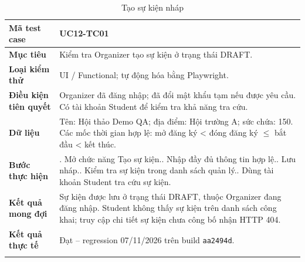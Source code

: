 \begin{table}[H]
\centering
\begingroup\small
\renewcommand{\arraystretch}{1.18}
\caption{Tạo sự kiện nháp}\label{tab:i1-detail-3}
\begin{tabularx}{\linewidth}{@{}p{.23\linewidth}>{\raggedright\arraybackslash}X@{}}
\toprule
\textbf{Mã test case} & \textbf{UC12-TC01} \\\midrule
\textbf{Mục tiêu} & Kiểm tra Organizer tạo sự kiện ở trạng thái DRAFT. \\ \addlinespace[3pt]
\textbf{Loại kiểm thử} & UI / Functional; tự động hóa bằng Playwright. \\ \addlinespace[3pt]
\textbf{Điều kiện tiên quyết} & Organizer đã đăng nhập; đã đổi mật khẩu tạm nếu được yêu cầu. Có tài khoản Student để kiểm tra khả năng tra cứu. \\ \addlinespace[3pt]
\textbf{Dữ liệu} & Tên: Hội thảo Demo QA; địa điểm: Hội trường A; sức chứa: 150. Các mốc thời gian hợp lệ: mở đăng ký < đóng đăng ký $\leq$ bắt đầu < kết thúc. \\ \addlinespace[3pt]
\textbf{Bước thực hiện} & 1. Mở chức năng Tạo sự kiện.\newline 2. Nhập đầy đủ thông tin hợp lệ.\newline 3. Lưu nháp.\newline 4. Kiểm tra sự kiện trong danh sách quản lý.\newline 5. Dùng tài khoản Student tra cứu sự kiện. \\ \addlinespace[3pt]
\textbf{Kết quả mong đợi} & Sự kiện được lưu ở trạng thái DRAFT, thuộc Organizer đang đăng nhập. Student không thấy sự kiện trên danh sách công khai; truy cập chi tiết sự kiện chưa công bố nhận HTTP 404. \\ \addlinespace[3pt]
\textbf{Kết quả thực tế} & Đạt -- regression 07/11/2026 trên build \texttt{aa2494d}.\\ \addlinespace[3pt]
\bottomrule
\end{tabularx}
\endgroup
\end{table}


